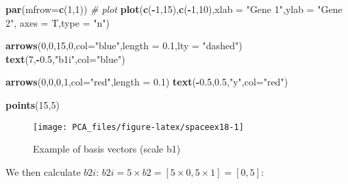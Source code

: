 \documentclass[
]{book}
\newenvironment{Shaded}{\begin{snugshade}}{\end{snugshade}}
\newcommand{\CommentTok}[1]{\textcolor[rgb]{0.56,0.35,0.01}{\textit{#1}}}
\newcommand{\DataTypeTok}[1]{\textcolor[rgb]{0.13,0.29,0.53}{#1}}
\newcommand{\DecValTok}[1]{\textcolor[rgb]{0.00,0.00,0.81}{#1}}
\newcommand{\FloatTok}[1]{\textcolor[rgb]{0.00,0.00,0.81}{#1}}
\newcommand{\KeywordTok}[1]{\textcolor[rgb]{0.13,0.29,0.53}{\textbf{#1}}}
\newcommand{\NormalTok}[1]{#1}
\newcommand{\OperatorTok}[1]{\textcolor[rgb]{0.81,0.36,0.00}{\textbf{#1}}}
\newcommand{\StringTok}[1]{\textcolor[rgb]{0.31,0.60,0.02}{#1}}
\theoremstyle{definition}
\theoremstyle{definition}
\theoremstyle{definition}
\theoremstyle{remark}
\begin{document}
\begin{Shaded}
\begin{Highlighting}[]
\KeywordTok{par}\NormalTok{(}\DataTypeTok{mfrow=}\KeywordTok{c}\NormalTok{(}\DecValTok{1}\NormalTok{,}\DecValTok{1}\NormalTok{))}
\CommentTok{# plot}
\KeywordTok{plot}\NormalTok{(}\KeywordTok{c}\NormalTok{(}\OperatorTok{-}\DecValTok{1}\NormalTok{,}\DecValTok{15}\NormalTok{),}\KeywordTok{c}\NormalTok{(}\OperatorTok{-}\DecValTok{1}\NormalTok{,}\DecValTok{10}\NormalTok{),}\DataTypeTok{xlab =} \StringTok{"Gene 1"}\NormalTok{,}\DataTypeTok{ylab =} \StringTok{"Gene 2"}\NormalTok{,}
 \DataTypeTok{axes =}\NormalTok{ T,}\DataTypeTok{type =} \StringTok{"n"}\NormalTok{)}

\KeywordTok{arrows}\NormalTok{(}\DecValTok{0}\NormalTok{,}\DecValTok{0}\NormalTok{,}\DecValTok{15}\NormalTok{,}\DecValTok{0}\NormalTok{,}\DataTypeTok{col=}\StringTok{"blue"}\NormalTok{,}\DataTypeTok{length =} \FloatTok{0.1}\NormalTok{,}\DataTypeTok{lty =} \StringTok{"dashed"}\NormalTok{)}
\KeywordTok{text}\NormalTok{(}\DecValTok{7}\NormalTok{,}\OperatorTok{-}\FloatTok{0.5}\NormalTok{,}\StringTok{"b1i"}\NormalTok{,}\DataTypeTok{col=}\StringTok{"blue"}\NormalTok{)}

\KeywordTok{arrows}\NormalTok{(}\DecValTok{0}\NormalTok{,}\DecValTok{0}\NormalTok{,}\DecValTok{0}\NormalTok{,}\DecValTok{1}\NormalTok{,}\DataTypeTok{col=}\StringTok{"red"}\NormalTok{,}\DataTypeTok{length =} \FloatTok{0.1}\NormalTok{)}
\KeywordTok{text}\NormalTok{(}\OperatorTok{-}\FloatTok{0.5}\NormalTok{,}\FloatTok{0.5}\NormalTok{,}\StringTok{"y"}\NormalTok{,}\DataTypeTok{col=}\StringTok{"red"}\NormalTok{)}

\KeywordTok{points}\NormalTok{(}\DecValTok{15}\NormalTok{,}\DecValTok{5}\NormalTok{)}
\end{Highlighting}
\end{Shaded}

\begin{figure}

{\centering \texttt{[image: PCA\_files/figure-latex/spaceex18-1]} 

}

\caption{Example of basis vectors (scale b1)}\label{fig:spaceex18}
\end{figure}

We then calculate \(b2i\): \(b2i=5 \times b2=[5 \times 0, 5 \times 1]=[0,5]\):
\end{document}

